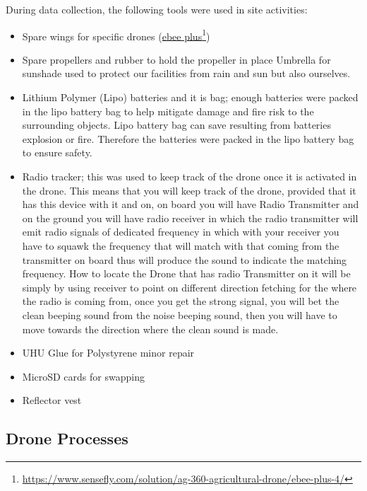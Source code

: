 \documentclass[a4paper,12pt,twoside]{article}
\begin{document}
    During data collection, the following tools were used in site activities:
    \begin{itemize}
  
        \item Spare wings for specific drones (\href{https://www.sensefly.com/solution/ag-360-agricultural-drone/ebee-plus-4/}{ebee plus}\footnote{\url{https://www.sensefly.com/solution/ag-360-agricultural-drone/ebee-plus-4/}})
        \item Spare propellers and rubber to hold the propeller in place
        Umbrella for sunshade used to protect our facilities from rain and sun but also ourselves.
        \item Lithium Polymer (Lipo) batteries and it is bag; enough batteries were packed in the lipo battery bag to help mitigate damage and fire risk to the surrounding objects. Lipo battery bag can save resulting from batteries explosion or fire. Therefore the batteries were packed in the lipo battery bag to ensure safety. 
        \item Radio tracker; this was used to keep track of the drone once it is activated in the drone. This means that you will keep track of the drone, provided that it has this device with it and on, on board you will have Radio Transmitter and on the ground you will have radio receiver in which the radio transmitter will emit radio signals of dedicated frequency in which with your receiver you have to squawk the frequency that will match with that coming from the transmitter on board thus will produce the sound to indicate the matching frequency. How to locate the Drone that has radio Transmitter on it will be simply by using receiver to point on different direction fetching for the where the radio is coming from, once you get the strong signal, you will bet the clean beeping sound from the noise beeping sound, then you will have to move towards the direction where the clean sound is made.
        \item UHU Glue for Polystyrene minor repair
        \item MicroSD cards for swapping
        \item Reflector vest
    \end{itemize}

\subsection{Drone Processes}
\end{document}
